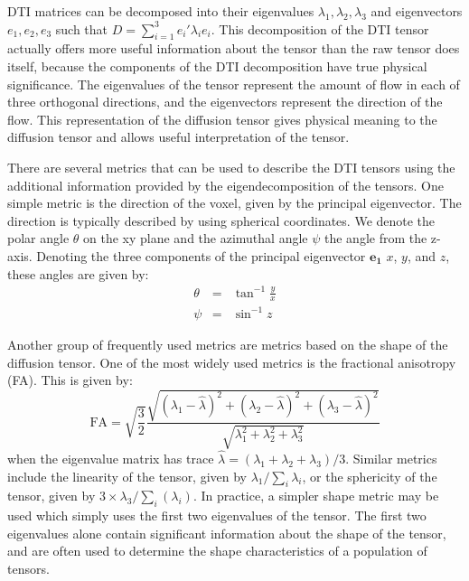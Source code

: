 \documentclass[10pt,a4paper, journal]{IEEEtran}
\begin{document}
DTI matrices can be decomposed into their eigenvalues $\lambda_1, \lambda_2, \lambda_3$ and eigenvectors $e_1, e_2, e_3$ such that $D = \sum_{i = 1}^3 e_i' \lambda_i e_i$.  This decomposition of the DTI tensor actually offers more useful information about the tensor than the raw tensor does itself, because the components of the DTI decomposition have true physical significance.  The eigenvalues of the tensor represent the amount of flow in each of three orthogonal directions, and the eigenvectors represent the direction of the flow.  This representation of the diffusion tensor gives physical meaning to the diffusion tensor and allows useful interpretation of the tensor.  

There are several metrics that can be used to describe the DTI tensors using the additional information provided by the eigendecomposition of the tensors.  One simple metric is the direction of the voxel, given by the principal eigenvector.  The direction is typically described by using spherical coordinates.  We denote the polar angle $\theta$ on the xy plane and the azimuthal angle $\psi$ the angle from the z-axis.  Denoting the three components of the principal eigenvector $\mathbf{e_1}$ $x$, $y$, and $z$, these angles are given by:
\begin{eqnarray}
\theta & = & \tan^{-1} \frac{y}{x} \\
\psi & = & \sin^{-1} z
\end{eqnarray}

Another group of frequently used metrics are metrics based on the shape of the diffusion tensor.  One of the most widely used metrics is the fractional anisotropy (FA).  This is given by: 
\begin{equation*}
\text{FA} = \sqrt{\frac{3}{2}} \frac{\sqrt{(\lambda_1 - \hat{\lambda})^2 + (\lambda_2 - \hat{\lambda})^2 + (\lambda_3 - \hat{\lambda})^2}}{\sqrt{\lambda_1^2 + \lambda_2^2 + \lambda_3^2}}
\end{equation*}
when the eigenvalue matrix has trace $\hat{\lambda} = (\lambda_1 + \lambda_2 + \lambda_3)/3$.  Similar metrics include the  linearity of the tensor, given by $\lambda_1 / \sum_i \lambda_i$, or the sphericity of the tensor, given by $3 \times \lambda_3 / \sum_i(\lambda_i)$.  In practice, a simpler shape metric may be used which simply uses the first two eigenvalues of the tensor.  The first two eigenvalues alone contain significant information about the shape of the tensor, and are often used to determine the shape characteristics of a population of tensors.  



\end{document}
